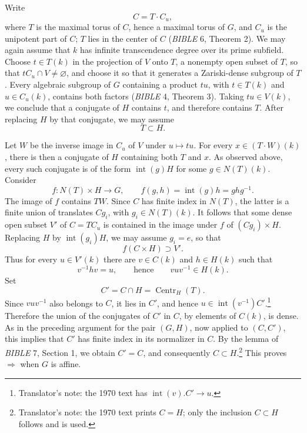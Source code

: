 Write
\[
  C=T\cdot C_u,
\]
where \(T\) is the maximal torus of \(C\), hence a maximal torus of
\(G\), and \(C_u\) is the unipotent part of \(C\); \(T\) lies in the
center of \(C\) (\emph{BIBLE} 6, Theorem 2). We may again assume that
\(k\) has infinite transcendence degree over its prime subfield.
Choose \(t\in T(k)\) in the projection of \(V\) onto \(T\), a
nonempty open subset of \(T\), so that
\(tC_u\cap V\neq\varnothing\), and choose it so that it generates a
Zariski-dense subgroup of \(T\). Every algebraic subgroup of \(G\)
containing a product \(tu\), with \(t\in T(k)\) and
\(u\in C_u(k)\), contains both factors (\emph{BIBLE} 4,
Theorem 3). Taking \(tu\in V(k)\), we conclude that a conjugate of
\(H\) contains \(t\), and therefore contains \(T\). After replacing
\(H\) by that conjugate, we may assume
\[
  T\subset H.
\]

Let \(W\) be the inverse image in \(C_u\) of \(V\) under
\(u\mapsto tu\). For every \(x\in(T\cdot W)(k)\), there is then a conjugate
of \(H\) containing both \(T\) and \(x\). As observed above, every
such conjugate is of the form \(\operatorname{int}(g)H\) for some
\(g\in N(T)(k)\). Consider
\[
  f:N(T)\times H\longrightarrow G,\qquad
  f(g,h)=\operatorname{int}(g)h=ghg^{-1}.
\]
The image of \(f\) contains \(TW\). Since \(C\) has finite index in
\(N(T)\), the latter is a finite union of translates \(Cg_i\), with
\(g_i\in N(T)(k)\). It follows that some dense open subset \(V'\) of
\(C=T C_u\) is contained in the image under \(f\) of
\((Cg_i)\times H\). Replacing \(H\) by
\(\operatorname{int}(g_i)H\), we may assume \(g_i=e\), so that
\[
  f(C\times H)\supset V'.
\]
Thus for every \(u\in V'(k)\) there are \(v\in C(k)\) and
\(h\in H(k)\) such that
\[
  v^{-1}hv=u,\qquad\text{hence}\qquad vuv^{-1}\in H(k).
\]
Set
\[
  C'=C\cap H=\operatorname{Centr}_H(T).
\]
Since \(vuv^{-1}\) also belongs to \(C\), it lies in \(C'\), and
hence \(u\in\operatorname{int}(v^{-1})C'\).\footnote{Translator's note:
the 1970 text has \(\operatorname{int}(v).C'\to u\).} Therefore the union of
the conjugates of \(C'\) in \(C\), by elements of \(C(k)\), is
dense. As in the preceding argument for the pair \((G,H)\), now
applied to \((C,C')\), this implies that \(C'\) has finite index in
its normalizer in \(C\). By the lemma of \emph{BIBLE} 7, Section 1,
we obtain \(C'=C\), and consequently \(C\subset H\).\footnote{Translator's
note: the 1970 text prints \(C=H\); only the inclusion \(C\subset H\)
follows and is used.} This proves
 \(\Rightarrow\)  when \(G\) is affine.

